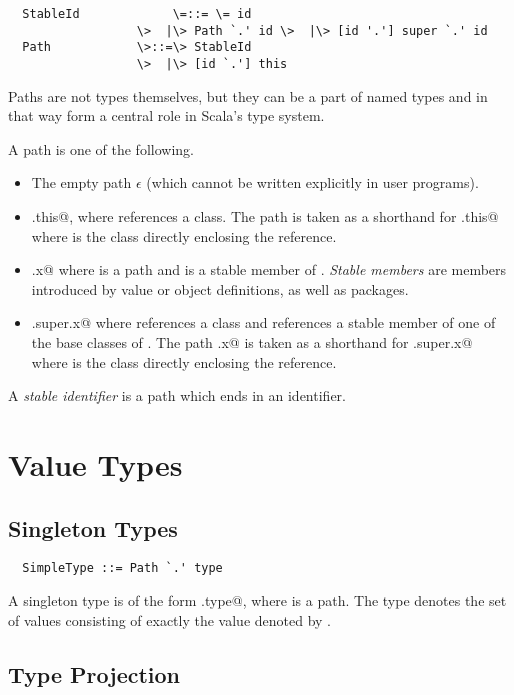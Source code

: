 \documentclass[11pt]{report}
\begin{document}
\syntax\begin{verbatim}
  StableId             \=::= \= id
                  \>  |\> Path `.' id \>  |\> [id '.'] super `.' id
  Path            \>::=\> StableId
                  \>  |\> [id `.'] this
\end{verbatim}

Paths are not types themselves, but they can be a part of named types
and in that way form a central role in Scala's type system.

A path is one of the following.
\begin{itemize}
\item
The empty path $\epsilon$ (which cannot be written explicitly in user programs).
\item
\verb@C.this@, where \verb@C@ references a class. 
The path \verb@this@ is taken as a shorthand for \verb@C.this@ where 
\verb@C@ is the class directly enclosing the reference. 
\item
\verb@p.x@ where \verb@p@ is a path and \verb@x@ is a stable member of \verb@p@.
{\em Stable members} are members introduced by value or object
definitions, as well as packages.
\item
\verb@C.super.x@ where \verb@C@ references a class and \verb@x@ references a 
stable member of
one of the base classes of \verb@C@. 
The path \verb@super.x@ is taken as a shorthand for \verb@C.super.x@ where 
\verb@C@ is the class directly enclosing the reference. 
\end{itemize}
A {\em stable identifier} is a path which ends in an identifier.

\section{Value Types}

\subsection{Singleton Types}
\label{sec:singleton-type}

\syntax\begin{verbatim}
  SimpleType ::= Path `.' type
\end{verbatim}

A singleton type is of the form \verb@p.type@, where \verb@p@ is a
path.  The type denotes the set of values consisting of
exactly the value denoted by \verb@p@.

\subsection{Type Projection}
\label{sec:type-project}
\end{document}
